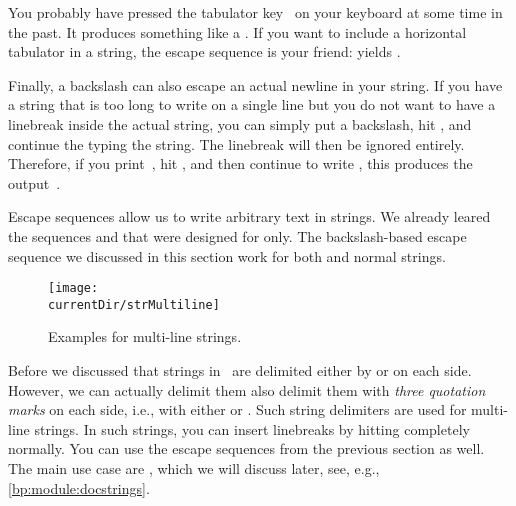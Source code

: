 You probably have pressed the tabulator key~\keys{\tab} on your keyboard at some time in the past.
It produces something like a .
If you want to include a horizontal tabulator in a string, the escape sequence  is your friend:
 yields .

Finally, a backslash can also escape an actual newline in your string.
If you have a string that is too long to write on a single line but you do not want to have a linebreak inside the actual string, you can simply put a backslash, hit \keys{\enter}, and continue the typing the string.
The linebreak will then be ignored entirely.
Therefore, if you print~, hit \keys{\enter}, and then continue to write , this produces the output~.

Escape sequences allow us to write arbitrary text in strings.
We already leared the sequences \inQuotes{\textbraceleft\textbraceleft}\pythonIdx{\textbraceleft\textbraceleft} and \inQuotes{\textbraceright\textbraceright}\pythonIdx{\textbraceright\textbraceright} that were designed for  only.
The backslash-based escape sequence we discussed in this section work for both  and normal strings.%
\endhsection%
%
%
%
\begin{figure}%
\centering%
\texttt{[image: \\currentDir/strMultiline]}%
\caption{Examples for multi-line strings.}%
\label{fig:strMultiline}%
\end{figure}%
%
Before we discussed that strings in \python\ are delimited either by \pythonIdx{\textquotedbl} or \pythonIdx{\textquotesingle} on each side.
However, we can actually delimit them also delimit them with \emph{three quotation marks} on each side, i.e., with either \pythonIdx{\textquotedbl\textquotedbl\textquotedbl} or \pythonIdx{\textquotesingle\textquotesingle\textquotesingle}.
Such string delimiters are used for multi-line strings.
In such strings, you can insert linebreaks by hitting \keys{\enter} completely normally.
You can use the escape sequences from the previous section as well.
The main use case are , which we will discuss later, see, e.g., \cref{bp:module:docstrings}.

